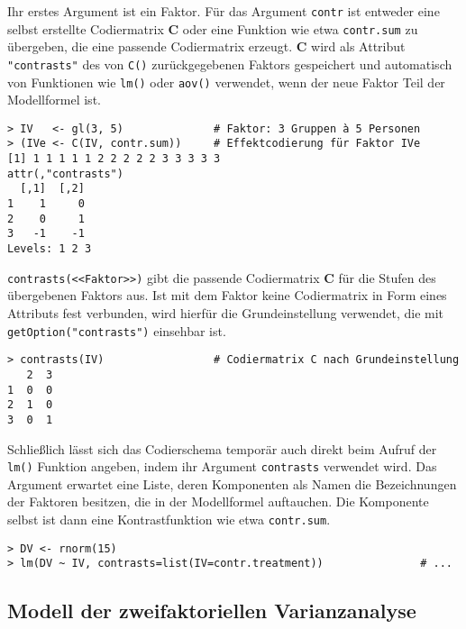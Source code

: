 Ihr erstes Argument ist ein Faktor. Für das Argument \lstinline!contr! ist entweder eine selbst erstellte Codiermatrix $\bm{C}$ oder eine Funktion wie etwa \lstinline!contr.sum! zu übergeben, die eine passende Codiermatrix erzeugt. $\bm{C}$ wird als Attribut \lstinline!"contrasts"! des von \lstinline!C()! zurückgegebenen Faktors gespeichert und automatisch von Funktionen wie \lstinline!lm()! oder \lstinline!aov()! verwendet, wenn der neue Faktor Teil der Modellformel ist.
\begin{lstlisting}
> IV   <- gl(3, 5)              # Faktor: 3 Gruppen à 5 Personen
> (IVe <- C(IV, contr.sum))     # Effektcodierung für Faktor IVe
[1] 1 1 1 1 1 2 2 2 2 2 3 3 3 3 3
attr(,"contrasts")
  [,1]  [,2]
1    1     0
2    0     1
3   -1    -1
Levels: 1 2 3
\end{lstlisting}

\lstinline!contrasts(<<Faktor>>)! gibt die passende Codiermatrix $\bm{C}$ für die Stufen des übergebenen Faktors aus. Ist mit dem Faktor keine Codiermatrix in Form eines Attributs fest verbunden, wird hierfür die Grundeinstellung verwendet, die mit \lstinline!getOption("contrasts")! einsehbar ist.
\begin{lstlisting}
> contrasts(IV)                 # Codiermatrix C nach Grundeinstellung
   2  3
1  0  0
2  1  0
3  0  1
\end{lstlisting}

Schließlich lässt sich das Codierschema temporär auch direkt beim Aufruf der \lstinline!lm()! Funktion angeben, indem ihr Argument \lstinline!contrasts! verwendet wird. Das Argument erwartet eine Liste, deren Komponenten als Namen die Bezeichnungen der Faktoren besitzen, die in der Modellformel auftauchen. Die Komponente selbst ist dann eine Kontrastfunktion wie etwa \lstinline!contr.sum!.
\begin{lstlisting}
> DV <- rnorm(15)
> lm(DV ~ IV, contrasts=list(IV=contr.treatment))               # ...
\end{lstlisting}

\subsection{Modell der zweifaktoriellen Varianzanalyse}
\label{sec:multALManovaCRF}

